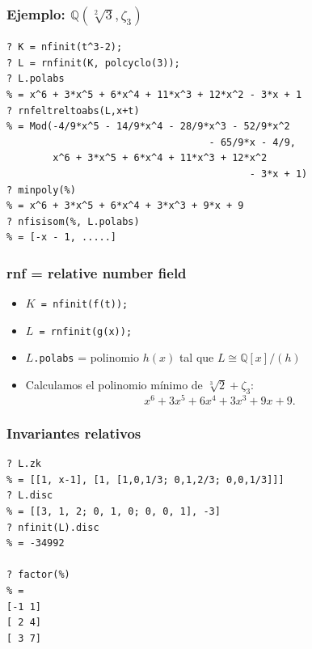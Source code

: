 \documentclass{beamer}
\newcommand{\QQ}{\mathbb{Q}}
\begin{document}
\begin{frame}[fragile]
  \frametitle{Ejemplo: $\QQ (\sqrt[2]{3},\zeta_3)$}
  \begin{shaded}\small
\begin{verbatim}
? K = nfinit(t^3-2);
? L = rnfinit(K, polcyclo(3));
? L.polabs
% = x^6 + 3*x^5 + 6*x^4 + 11*x^3 + 12*x^2 - 3*x + 1
? rnfeltreltoabs(L,x+t)
% = Mod(-4/9*x^5 - 14/9*x^4 - 28/9*x^3 - 52/9*x^2
                                   - 65/9*x - 4/9,
        x^6 + 3*x^5 + 6*x^4 + 11*x^3 + 12*x^2
                                          - 3*x + 1)
? minpoly(%)
% = x^6 + 3*x^5 + 6*x^4 + 3*x^3 + 9*x + 9
? nfisisom(%, L.polabs)
% = [-x - 1, .....]
\end{verbatim}
  \end{shaded}
\end{frame}


\begin{frame}[fragile]
  \frametitle{rnf = relative number field}

  \begin{itemize}
  \item \texttt{$K$ = nfinit(f(t));}
  \item \texttt{$L$ = rnfinit(g(x));}
  \item \texttt{$L$.polabs} = polinomio $h (x)$ tal que $L \cong \QQ[x]/(h)$
  \item Calculamos el polinomio mínimo de $\sqrt[3]{2} + \zeta_3$:
    $$x^6 + 3 x^5 + 6 x^4 + 3 x^3 + 9 x + 9.$$
  \end{itemize}
\end{frame}


\begin{frame}[fragile]
  \frametitle{Invariantes relativos}

  \begin{shaded}\small
\begin{verbatim}
? L.zk
% = [[1, x-1], [1, [1,0,1/3; 0,1,2/3; 0,0,1/3]]]
? L.disc
% = [[3, 1, 2; 0, 1, 0; 0, 0, 1], -3]
? nfinit(L).disc
% = -34992

? factor(%)
% = 
[-1 1]
[ 2 4]
[ 3 7]
\end{verbatim}
  \end{shaded}
\end{frame}

\end{document}
